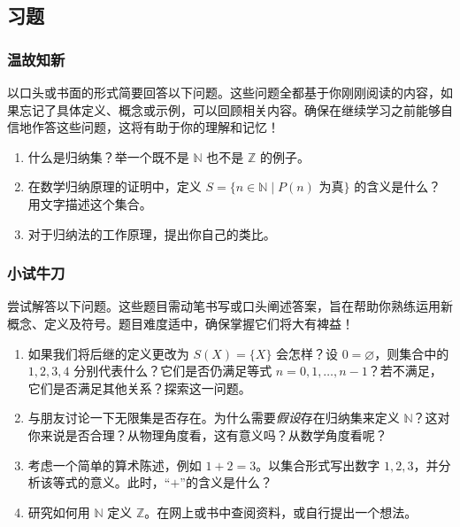 \subsection{习题}

\subsubsection*{温故知新}

以口头或书面的形式简要回答以下问题。这些问题全都基于你刚刚阅读的内容，如果忘记了具体定义、概念或示例，可以回顾相关内容。确保在继续学习之前能够自信地作答这些问题，这将有助于你的理解和记忆！

\begin{enumerate}[label=(\arabic*)]
    \item 什么是归纳集？举一个既不是 $\mathbb{N}$ 也不是 $\mathbb{Z}$ 的例子。
    \item 在数学归纳原理的证明中，定义 $S = \{n \in \mathbb{N} \mid P(n) \text{\ 为真}\}$ 的含义是什么？用文字描述这个集合。
    \item 对于归纳法的工作原理，提出你自己的类比。
\end{enumerate}

\subsubsection*{小试牛刀}

尝试解答以下问题。这些题目需动笔书写或口头阐述答案，旨在帮助你熟练运用新概念、定义及符号。题目难度适中，确保掌握它们将大有裨益！

\begin{enumerate}[label=(\arabic*)]
    \item 如果我们将后继的定义更改为 $S(X) = \{X\}$ 会怎样？设 $0 = \varnothing$，则集合中的 $1, 2, 3, 4$ 分别代表什么？它们是否仍满足等式 $n = {0, 1, \dots, n-1}$？若不满足，它们是否满足其他关系？探索这一问题。
    \item 与朋友讨论一下无限集是否存在。为什么需要\emph{假设}存在归纳集来定义 $\mathbb{N}$？这对你来说是否合理？从物理角度看，这有意义吗？从数学角度看呢？
    \item 考虑一个简单的算术陈述，例如 $1 + 2 = 3$。以集合形式写出数字 $1, 2, 3$，并分析该等式的意义。此时，``$+$''的含义是什么？
    \item 研究如何用 $\mathbb{N}$ 定义 $\mathbb{Z}$。在网上或书中查阅资料，或自行提出一个想法。
\end{enumerate}